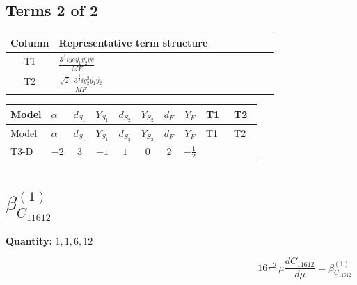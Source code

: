 \documentclass[8pt]{article}
\begin{document}
\begin{landscape}
\subsection*{Terms 2 of 2}
\begin{center}
\begin{tabular}{@{}c >{\raggedright\arraybackslash}p{0.82\linewidth}@{}}
\toprule
Column & Representative term structure \\
\midrule
T1 & \(\displaystyle \frac{3^{\frac{3}{4}} i ye \overline{y_{1}} \overline{y_{2}} \overline{ye}}{MF}\) \\
\midrule
T2 & \(\displaystyle \frac{\sqrt{2} \cdot 3^{\frac{3}{4}} i g_{2}^{2} \overline{y_{1}} \overline{y_{2}}}{MF}\) \\
\midrule
\bottomrule
\end{tabular}
\end{center}
\smallskip
\tiny
\begin{longtable}{@{}llcccccc >{\raggedright\arraybackslash}p{0.21\linewidth} >{\raggedright\arraybackslash}p{0.21\linewidth}@{}}
\toprule
Model & $\alpha$ & $d_{S_1}$ & $Y_{S_1}$ & $d_{S_2}$ & $Y_{S_2}$ & $d_F$ & $Y_F$ & T1 & T2 \\
\midrule
\endfirsthead
\toprule
Model & $\alpha$ & $d_{S_1}$ & $Y_{S_1}$ & $d_{S_2}$ & $Y_{S_2}$ & $d_F$ & $Y_F$ & T1 & T2 \\
\midrule
\endhead
T3-D & $-2$ & $3$ & $-1$ & $1$ & $0$ & $2$ & $-\frac{1}{2}$ & \scriptsize\adjustbox{max width=\linewidth}{$\begin{gathered} - \frac{3^{\frac{3}{4}} i ye \overline{y_{1}} \overline{y_{2}} \overline{ye}}{12 MF}\end{gathered}$} & \scriptsize\adjustbox{max width=\linewidth}{$\begin{gathered} \frac{\sqrt{2} \cdot 3^{\frac{3}{4}} i g_{2}^{2} \overline{y_{1}} \overline{y_{2}}}{3 MF}\end{gathered}$} \\
\midrule
\bottomrule
\end{longtable}
\clearpage
\section*{$\beta_{C_{11612}}^{(1)}$}
\noindent\textbf{Quantity: }$\mathrm{1,1,6,12}$\par\smallskip
\[16\pi^2\,\mu\frac{d C_{11612}}{d\mu}=\beta_{C_{11612}}^{(1)}\]

\end{landscape}
\end{document}
